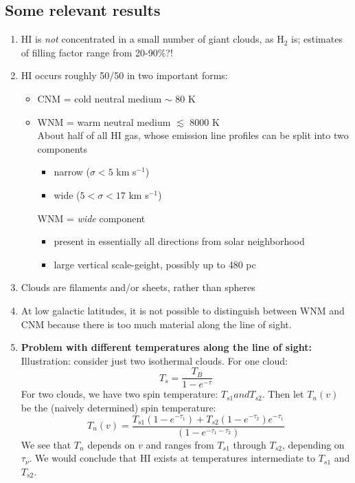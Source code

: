 \documentclass[12pt]{article}
\newcommand{\mar}[1]{\hspace{0pt}\marginpar{-\textcolor{black}{#1}-}}
\begin{document}
\subsection{Some relevant results}
\mar{47}
\begin{enumerate}
    \item HI is \emph{not} concentrated in a small number of giant clouds,
        as H$_{2}$ is; estimates of filling factor range from 20-90\%?!
    \item HI occurs roughly 50/50 in two important forms:
        \begin{itemize}[itemsep=0.5mm]
            \item CNM = cold neutral medium $\sim$ 80 K
            \item WNM = warm neutral medium $\lesssim$ 8000 K\\
                About half of all HI gas, whose emission line
                profiles can be split into two components
                \begin{itemize}
                    \item narrow ($\sigma < 5$ km s$^{-1}$)
                    \item wide ($5 < \sigma < 17$ km s$^{-1}$)
                \end{itemize}
                WNM = \emph{wide} component
                \begin{itemize}
                    \item present in essentially all directions from solar neighborhood
                    \item large vertical scale-geight, possibly up to 480 pc
                \end{itemize}
        \end{itemize}
    \item Clouds are filaments and/or sheets, rather than spheres
    \item At low galactic latitudes, it is not possible to distinguish between
        WNM and CNM because there is too much material along the line of sight.
    \item \textbf{Problem with different temperatures along the line of sight:}
        Illustration: consider just two isothermal clouds. For one cloud:
        \[
            T_{s} = \frac{T_{B}}{1 - e^{-\tau}}
            \]
        For two clouds, we have two spin temperature: $T_{s1} and T_{s2}$.
        \mar{48}Then let $T_{n}(v)$ be the (naively determined) spin
        temperature:
        \[
            T_{n}(v) = \frac
                { T_{s1} ( 1 - e^{-\tau_{1}}) + T_{s2} ( 1 - e^{-\tau_{2}})e^{-\tau_{1}} }
                { (1 - e^{-\tau_{1}-\tau_{2}}) }
            \]
        We see that $T_{n}$ depends on $v$ and ranges from $T_{s1}$ through
        $T_{s2}$, depending on $\tau_{\nu}$. We would conclude that HI exists at
        temperatures intermediate to $T_{s1}$ and $T_{s2}$.
\end{enumerate}
\end{document}
